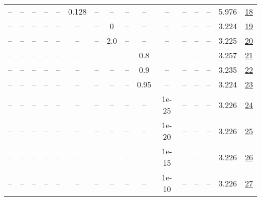 \begin{table}[H]
\begin{tabular}{cccccccccccccccc}
-- & -- & -- & -- & -- & 0.128 & -- & -- & -- & -- & -- & -- & -- & -- & 5.976 & \href{https://wandb.ai/stanford-mercury/optimizer-scaling/runs/sweep-300m-6B-muona26da7lr0.128-wd0.1-minlr0-warmup0-b10.8-b20.9-8bdb6d}{18} \\
-- & -- & -- & -- & -- & -- & -- & 0 & -- & -- & -- & -- & -- & -- & 3.224 & \href{https://wandb.ai/stanford-mercury/optimizer-scaling/runs/sweep-300m-6B-muon157c7clr0.008-wd0.1-minlr0-warmup0-b10.8-b20.9-c25630}{19} \\
-- & -- & -- & -- & -- & -- & -- & 2.0 & -- & -- & -- & -- & -- & -- & 3.225 & \href{https://wandb.ai/stanford-mercury/optimizer-scaling/runs/sweep-300m-6B-muon6f1c4clr0.008-wd0.1-minlr0-warmup0-b10.8-b20.9-0bdac2}{20} \\
-- & -- & -- & -- & -- & -- & -- & -- & -- & 0.8 & -- & -- & -- & -- & 3.257 & \href{https://wandb.ai/stanford-mercury/optimizer-scaling/runs/sweep-300m-6B-muonb24f84lr0.008-wd0.1-minlr0-warmup0-b10.8-b20.9-22bf93}{21} \\
-- & -- & -- & -- & -- & -- & -- & -- & -- & 0.9 & -- & -- & -- & -- & 3.235 & \href{https://wandb.ai/stanford-mercury/optimizer-scaling/runs/sweep-300m-6B-muon607e74lr0.008-wd0.1-minlr0-warmup0-b10.8-b20.9-4429b0}{22} \\
-- & -- & -- & -- & -- & -- & -- & -- & -- & 0.95 & -- & -- & -- & -- & 3.224 & \href{https://wandb.ai/stanford-mercury/optimizer-scaling/runs/sweep-300m-6B-muonf6219clr0.008-wd0.1-minlr0-warmup0-b10.8-b20.9-370a77}{23} \\
-- & -- & -- & -- & -- & -- & -- & -- & -- & -- & 1e-25 & -- & -- & -- & 3.226 & \href{https://wandb.ai/stanford-mercury/optimizer-scaling/runs/sweep-300m-6B-muonac34c0lr0.008-wd0.1-minlr0-warmup0-b10.8-b20.9-467678}{24} \\
-- & -- & -- & -- & -- & -- & -- & -- & -- & -- & 1e-20 & -- & -- & -- & 3.226 & \href{https://wandb.ai/stanford-mercury/optimizer-scaling/runs/sweep-300m-6B-muonbbf41alr0.008-wd0.1-minlr0-warmup0-b10.8-b20.9-bafb4a}{25} \\
-- & -- & -- & -- & -- & -- & -- & -- & -- & -- & 1e-15 & -- & -- & -- & 3.226 & \href{https://wandb.ai/stanford-mercury/optimizer-scaling/runs/sweep-300m-6B-muon443e3alr0.008-wd0.1-minlr0-warmup0-b10.8-b20.9-e4049e}{26} \\
-- & -- & -- & -- & -- & -- & -- & -- & -- & -- & 1e-10 & -- & -- & -- & 3.226 & \href{https://wandb.ai/stanford-mercury/optimizer-scaling/runs/sweep-300m-6B-muon369269lr0.008-wd0.1-minlr0-warmup0-b10.8-b20.9-38146c}{27} \\

\end{tabular}
\end{table}
